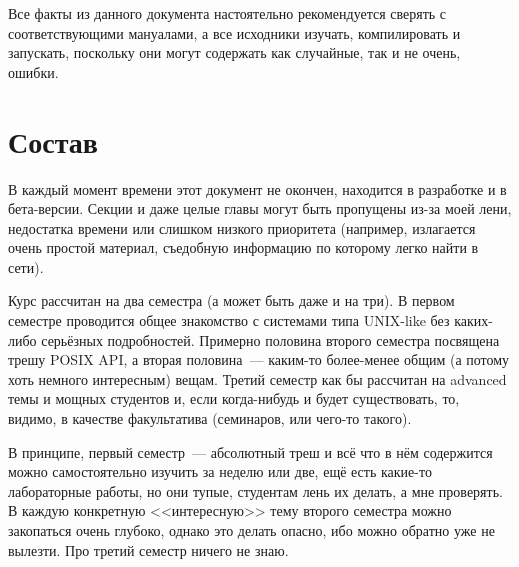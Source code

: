Все факты из данного документа настоятельно рекомендуется сверять с соответствующими мануалами, а все исходники изучать, компилировать и запускать, поскольку они могут содержать как случайные, так и не очень, ошибки.

\section*{Состав}
В каждый момент времени этот документ не окончен, находится в разработке и в бета-версии.
Секции и даже целые главы могут быть пропущены из-за моей лени, недостатка времени или слишком низкого приоритета (например, излагается очень простой материал, съедобную информацию по которому легко найти в сети).

Курс рассчитан на два семестра (а может быть даже и на три).
В первом семестре проводится общее знакомство с системами типа UNIX-like без каких-либо серьёзных подробностей.
Примерно половина второго семестра посвящена трешу POSIX API, а вторая половина~--- каким-то более-менее общим (а потому хоть немного интересным) вещам.
Третий семестр как бы рассчитан на advanced темы и мощных студентов и, если когда-нибудь и будет существовать, то, видимо, в качестве факультатива (семинаров, или чего-то такого).

В принципе, первый семестр~--- абсолютный треш и всё что в нём содержится можно самостоятельно изучить за неделю или две, ещё есть какие-то лабораторные работы, но они тупые, студентам лень их делать, а мне проверять.
В каждую конкретную <<интересную>> тему второго семестра можно закопаться очень глубоко, однако это делать опасно, ибо можно обратно уже не вылезти.
Про третий семестр ничего не знаю.
